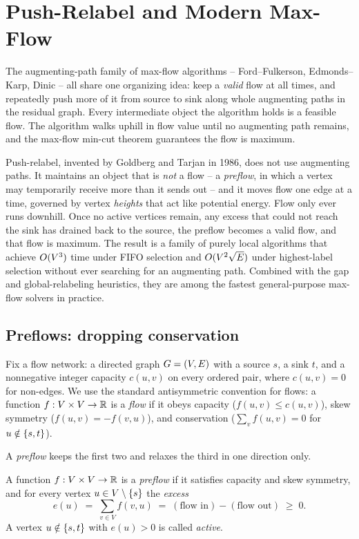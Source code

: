 \chapter{Push-Relabel and Modern Max-Flow}

The augmenting-path family of max-flow algorithms -- Ford--Fulkerson, Edmonds--Karp, Dinic -- all share one organizing idea: keep a \emph{valid} flow at all times, and repeatedly push more of it from source to sink along whole augmenting paths in the residual graph. Every intermediate object the algorithm holds is a feasible flow. The algorithm walks uphill in flow value until no augmenting path remains, and the max-flow min-cut theorem guarantees the flow is maximum.

Push-relabel, invented by Goldberg and Tarjan in 1986, does not use augmenting paths. It maintains an object that is \emph{not} a flow -- a \emph{preflow}, in which a vertex may temporarily receive more than it sends out -- and it moves flow one edge at a time, governed by vertex \emph{heights} that act like potential energy. Flow only ever runs downhill. Once no active vertices remain, any excess that could not reach the sink has drained back to the source, the preflow becomes a valid flow, and that flow is maximum. The result is a family of purely local algorithms that achieve $O(V^3)$ time under FIFO selection and $O(V^2\sqrt{E})$ under highest-label selection without ever searching for an augmenting path. Combined with the gap and global-relabeling heuristics, they are among the fastest general-purpose max-flow solvers in practice.

\chapterline

\section{Preflows: dropping conservation}
\label{ch13:preflows}

Fix a flow network: a directed graph $G=(V,E)$ with a source $s$, a sink $t$, and a nonnegative integer capacity $c(u,v)$ on every ordered pair, where $c(u,v)=0$ for non-edges. We use the standard antisymmetric convention for flows: a function $f:V\times V\to\mathbb{R}$ is a \emph{flow} if it obeys capacity ($f(u,v)\le c(u,v)$), skew symmetry ($f(u,v)=-f(v,u)$), and conservation ($\sum_v f(u,v)=0$ for $u\notin\{s,t\}$).

A \emph{preflow} keeps the first two and relaxes the third in one direction only.

\begin{definition}[Preflow]
\label{ch13:def-preflow}
A function $f:V\times V\to\mathbb{R}$ is a \emph{preflow} if it satisfies capacity and skew symmetry, and for every vertex $u\in V\setminus\{s\}$ the \emph{excess}
\[
  e(u) \;=\; \sum_{v\in V} f(v,u) \;=\; (\text{flow in}) - (\text{flow out}) \;\ge\; 0.
\]
A vertex $u\notin\{s,t\}$ with $e(u)>0$ is called \emph{active}.
\end{definition}

